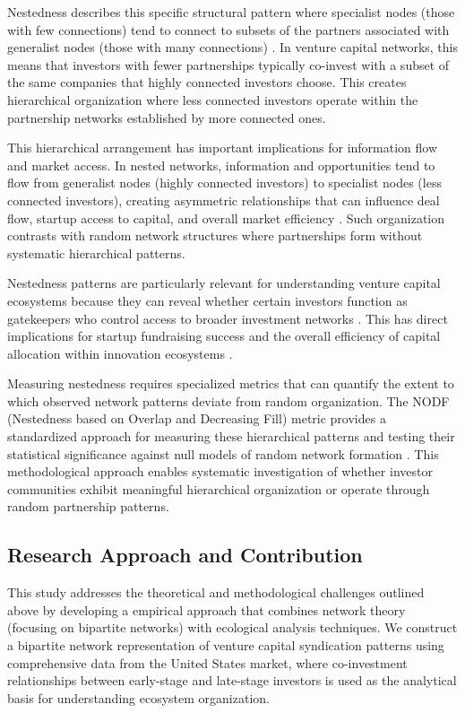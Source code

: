 Nestedness describes this specific structural pattern where specialist nodes (those with few connections) tend to connect to subsets of the partners associated with generalist nodes (those with many connections) \cite{Mariani2019}. In venture capital networks, this means that investors with fewer partnerships typically co-invest with a subset of the same companies that highly connected investors choose. This creates hierarchical organization where less connected investors operate within the partnership networks established by more connected ones.

This hierarchical arrangement has important implications for information flow and market access. In nested networks, information and opportunities tend to flow from generalist nodes (highly connected investors) to specialist nodes (less connected investors), creating asymmetric relationships that can influence deal flow, startup access to capital, and overall market efficiency \cite{Mariani2019}. Such organization contrasts with random network structures where partnerships form without systematic hierarchical patterns.

Nestedness patterns are particularly relevant for understanding venture capital ecosystems because they can reveal whether certain investors function as gatekeepers who control access to broader investment networks \cite{Borgatti2011}. This has direct implications for startup fundraising success and the overall efficiency of capital allocation within innovation ecosystems \cite{Theophile2024}.

Measuring nestedness requires specialized metrics that can quantify the extent to which observed network patterns deviate from random organization. The NODF (Nestedness based on Overlap and Decreasing Fill) metric provides a standardized approach for measuring these hierarchical patterns and testing their statistical significance against null models of random network formation \cite{Mariani2019}. This methodological approach enables systematic investigation of whether investor communities exhibit meaningful hierarchical organization or operate through random partnership patterns.

\subsection{Research Approach and Contribution}

This study addresses the theoretical and methodological challenges outlined above by developing a empirical approach that combines network theory (focusing on bipartite networks) with ecological analysis techniques. We construct a bipartite network representation of venture capital syndication patterns using comprehensive data from the United States market, where co-investment relationships between early-stage and late-stage investors is used as the analytical basis for understanding ecosystem organization.

